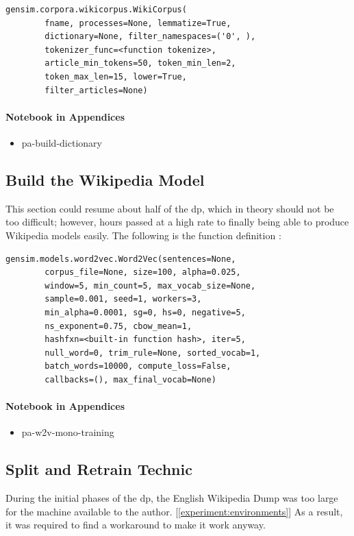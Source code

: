 \begin{lstlisting}
gensim.corpora.wikicorpus.WikiCorpus(
        fname, processes=None, lemmatize=True,
        dictionary=None, filter_namespaces=('0', ),
        tokenizer_func=<function tokenize>,
        article_min_tokens=50, token_min_len=2,
        token_max_len=15, lower=True, 
        filter_articles=None)
\end{lstlisting}

\paragraph{Notebook in Appendices}
\begin{itemize}
    \setlength\itemsep{0em}
    \item pa-build-dictionary
\end{itemize}


\subsection{Build the Wikipedia Model}
This section could resume about half of the \gls{dp}, which in theory should not be too difficult; however, hours passed at a high rate to finally being able to produce Wikipedia models easily. The following is the function definition \cite{article:gensim-api}: \\

\begin{lstlisting}
gensim.models.word2vec.Word2Vec(sentences=None,
        corpus_file=None, size=100, alpha=0.025,
        window=5, min_count=5, max_vocab_size=None,
        sample=0.001, seed=1, workers=3,
        min_alpha=0.0001, sg=0, hs=0, negative=5,
        ns_exponent=0.75, cbow_mean=1,
        hashfxn=<built-in function hash>, iter=5,
        null_word=0, trim_rule=None, sorted_vocab=1,
        batch_words=10000, compute_loss=False,
        callbacks=(), max_final_vocab=None)
\end{lstlisting}

\paragraph{Notebook in Appendices}
\begin{itemize}
    \setlength\itemsep{0em}
    \item pa-w2v-mono-training
\end{itemize}


\subsection{Split and Retrain Technic}
\label{experiment:split-retrain}
During the initial phases of the \gls{dp}, the English Wikipedia Dump was too large for the machine available to the author. [\ref{experiment:environments}] As a result, it was required to find a workaround to make it work anyway.

